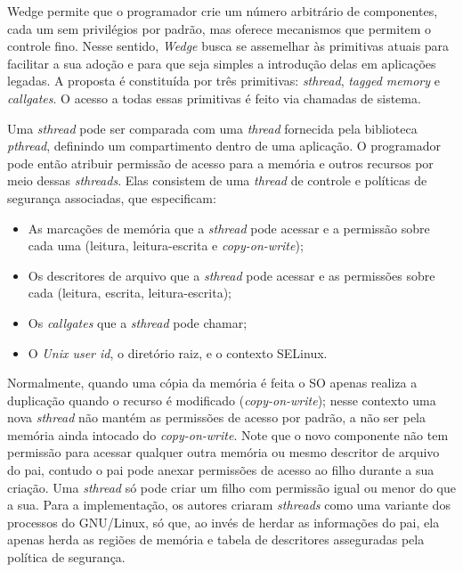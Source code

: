 Wedge permite que o programador crie um número arbitrário de
componentes, cada um sem privilégios por padrão, mas oferece mecanismos que
permitem o controle fino. Nesse sentido, \emph{Wedge} busca se assemelhar às
primitivas atuais para facilitar a sua adoção e para que seja simples a
introdução delas em aplicações legadas. A proposta é constituída por três
primitivas: \emph{sthread}, \emph{tagged memory} e \emph{callgates}. O
acesso a todas essas primitivas é feito via chamadas de sistema.

Uma \emph{sthread} pode ser comparada com uma \emph{thread} fornecida pela biblioteca
\textit{pthread}, definindo um compartimento dentro de uma
aplicação. O programador pode então atribuir permissão de acesso para a memória
e outros recursos por meio dessas \emph{sthreads}. Elas consistem de uma
\emph{thread} de controle e políticas de segurança associadas, que especificam:

\begin{itemize}
	\item As marcações de memória que a \emph{sthread} pode acessar e a permissão
				sobre cada uma (leitura, leitura-escrita e \textit{copy-on-write});
	\item Os descritores de arquivo que a \emph{sthread} pode acessar e as
				permissões sobre cada (leitura, escrita, leitura-escrita);
	\item Os \emph{callgates} que a \emph{sthread} pode chamar;
	\item O \emph{Unix user id}, o diretório raiz, e o contexto SELinux.
\end{itemize}

Normalmente, quando uma cópia da memória é feita o SO apenas realiza a
duplicação quando o recurso é modificado (\emph{copy-on-write}); nesse contexto
uma nova \emph{sthread} não mantém as permissões de acesso por padrão, a não
ser pela memória ainda intocado do \emph{copy-on-write}. Note que o novo
componente não tem permissão para acessar qualquer outra memória ou mesmo
descritor de arquivo do pai, contudo o pai pode anexar permissões de acesso ao
filho durante a sua criação. Uma \emph{sthread} só pode criar um filho com
permissão igual ou menor do que a sua. Para a implementação, os autores criaram
\emph{sthreads} como uma variante dos processos do GNU/Linux, só que, ao invés
de herdar as informações do pai, ela apenas herda as regiões de memória e
tabela de descritores asseguradas pela política de segurança.

